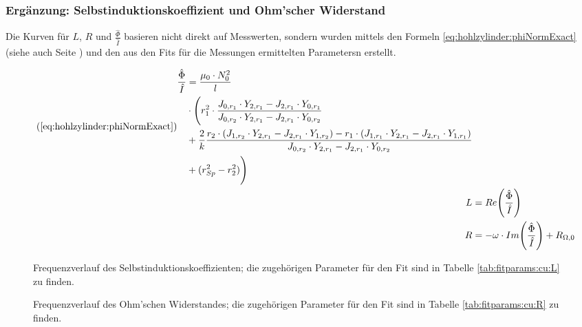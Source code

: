 \subsubsection{Erg\"anzung: Selbstinduktionskoeffizient und Ohm'scher Widerstand}
\label{sec:ausw:subsec:hohlz:cu:subsubsec:LR}

Die    Kurven     f\"ur    $L$,    $R$     und    $\frac{\hat{\Phi}}{\hat{I}}$
basieren    nicht   direkt    auf   Messwerten,    sondern   wurden    mittels
den    Formeln    \ref{eq:hohlzylinder:phiNormExact}   (siehe    auch    Seite
\pageref{eq:hohlzylinder:phiNormExact})  und  den  aus   den  Fits  f\"ur  die
Messungen ermittelten Parametersn erstellt.

\begin{align*}
    \tag{\ref{eq:hohlzylinder:phiNormExact}}
    \begin{split}
    \frac{\hat{\Phi}}{\hat{I}} & = \frac{\mu_0 \cdot N_0^2}{l} \\
                               & \cdot \Biggl( r_1^2 \cdot \frac{J_{0,r_1} \cdot Y_{2,r_1} - J_{2,r_1} \cdot Y_{0,r_1}}{J_{0,r_2} \cdot Y_{2,r_1} - J_{2,r_1} \cdot Y_{0,r_2}} \\
                               & + \frac{2}{k} \frac{r_2 \cdot (J_{1,r_2} \cdot Y_{2,r_1} - J_{2,r_1} \cdot Y_{1,r_2}) - r_1 \cdot (J_{1,r_1} \cdot Y_{2,r_1} - J_{2,r_1} \cdot Y_{1,r_1})}{J_{0,r_2} \cdot Y_{2,r_1} - J_{2,r_1} \cdot Y_{0,r_2}} \\
                               & + (r_{Sp}^2 - r_2^2) \Biggr)
    \end{split} \\
    L & = Re \Biggl(\frac{\hat{\Phi}}{\hat{I}} \Biggr) \\
    R & = - \omega \cdot Im \Biggl(\frac{\hat{\Phi}}{\hat{I}} \Biggr) + R_{\Omega,0}
\end{align*}

\clearpage
\begin{figure}[h!]
    \resizebox{\textwidth}{!}{}
    \caption{
        Frequenzverlauf  des Selbstinduktionskoeffizienten;  die zugeh\"origen
        Parameter f\"ur  den Fit  sind in Tabelle  \ref{tab:fitparams:cu:L} zu
        finden.
    }
    \label{fig:cu:freq:L}
\end{figure}
\begin{figure}[h!]
    \resizebox{\textwidth}{!}{}
    \caption{
        Frequenzverlauf   des   Ohm'schen  Widerstandes;   die   zugeh\"origen
        Parameter f\"ur  den Fit  sind in Tabelle  \ref{tab:fitparams:cu:R} zu
        finden.
    }
    \label{fig:cu:freq:R}
\end{figure}

